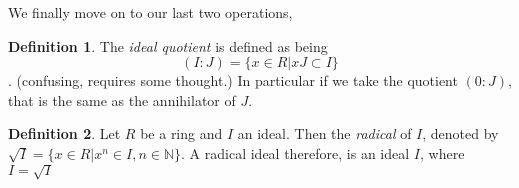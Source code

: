 \documentclass[12pt]{book}
\theoremstyle{definition}
\newtheorem*{definition}{Definition}
\begin{document}
We finally move on to our last two operations, 
\begin{definition}
    The \textit{ideal quotient} is defined as being $$(I : J) = \{x \in R| xJ \subset I\}$$. (confusing, requires some thought.)
    In particular if we take the quotient $(0: J)$, that is the same as the annihilator of $J$.
\end{definition}
\begin{definition}
    Let $R$ be a ring and $I$ an ideal. Then the \textit{radical} of $I$, denoted by $\sqrt{I} = \{x \in R| x^n \in I, n \in \mathbb{N}\}$. A radical ideal therefore, is an ideal $I$, where $I = \sqrt{I}$
\end{definition}
\end{document}
